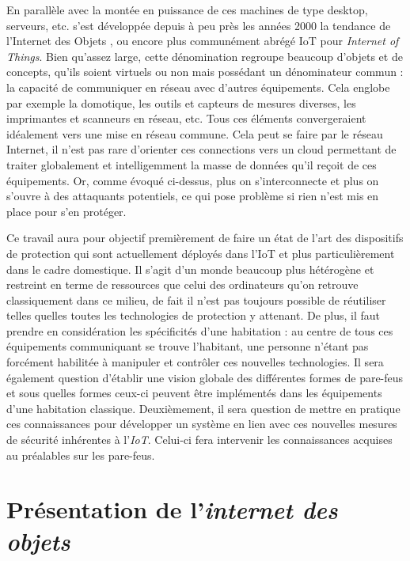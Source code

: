 \documentclass[]{article}
\begin{document}
\par En parallèle avec la montée en puissance de ces machines de type desktop, serveurs, etc. s'est développée depuis à peu près les années 2000 la tendance de l'\og Internet des Objets \fg{}, ou encore plus communément abrégé IoT pour \textit{Internet of Things}. Bien qu'assez large, cette dénomination regroupe beaucoup d'objets et de concepts, qu'ils soient virtuels ou non mais possédant un dénominateur commun : la capacité de communiquer en réseau avec d'autres équipements. Cela englobe par exemple la domotique, les outils et capteurs de mesures diverses, les imprimantes et scanneurs en réseau, etc. Tous ces éléments convergeraient idéalement vers une mise en réseau commune. Cela peut se faire par le réseau Internet, il n'est pas rare d'orienter ces connections vers un cloud permettant de traiter globalement et intelligemment la masse de données qu'il reçoit de ces équipements. Or, comme évoqué ci-dessus, plus on s'interconnecte et plus on s'ouvre à des attaquants potentiels, ce qui pose problème si rien n'est mis en place pour s'en protéger.\\

\par Ce travail aura pour objectif premièrement de faire un état de l'art des dispositifs de protection qui sont actuellement déployés dans l'IoT et plus particulièrement dans le cadre domestique. Il s'agit d'un monde beaucoup plus hétérogène et restreint en terme de ressources que celui des ordinateurs qu'on retrouve classiquement dans ce milieu, de fait il n'est pas toujours possible de réutiliser telles quelles toutes les technologies de protection y attenant. De plus, il faut prendre en considération les spécificités d'une habitation : au centre de tous ces équipements communiquant se trouve l'habitant, une personne n'étant pas forcément habilitée à manipuler et contrôler ces nouvelles technologies. Il sera également question d'établir une vision globale des différentes formes de pare-feus et sous quelles formes ceux-ci peuvent être implémentés dans les équipements d'une habitation classique. Deuxièmement, il sera question de mettre en pratique ces connaissances pour développer un système en lien avec ces nouvelles mesures de sécurité inhérentes à l'\textit{IoT}. Celui-ci fera intervenir les connaissances acquises au préalables sur les pare-feus.

\newpage
\section{Présentation de l'\textit{internet des objets}}
\end{document}
